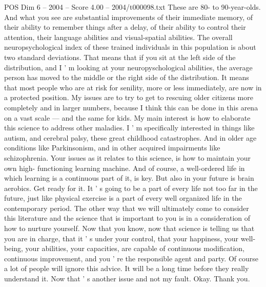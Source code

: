 \begin{textsample}{POS Dim 6 – 2004 – Score 4.00 – 2004/t000098.txt}
These are 80- to 90-year-olds.
And what you see are substantial improvements of their immediate memory, of their ability to remember things after a delay, of their ability to control their attention, their language abilities and visual-spatial abilities.
The overall neuropsychological index of these trained individuals in this population is about two standard deviations.
That means that if you sit at the left side of the distribution, and I ' m looking at your neuropyschological abilities, the average person has moved to the middle or the right side of the distribution.
It means that most people who are at risk for senility, more or less immediately, are now in a protected position.
My issues are to try to get to rescuing older citizens more completely and in larger numbers, because I think this can be done in this arena on a vast scale — and the same for kids.
My main interest is how to elaborate this science to address other maladies.
I ' m specifically interested in things like autism, and cerebral palsy, these great childhood catastrophes.
And in older age conditions like Parkinsonism, and in other acquired impairments like schizophrenia.
Your issues as it relates to this science, is how to maintain your own high- functioning learning machine.
And of course, a well-ordered life in which learning is a continuous part of it, is key.
But also in your future is brain aerobics.
Get ready for it.
It ' s going to be a part of every life not too far in the future, just like physical exercise is a part of every well organized life in the contemporary period.
The other way that we will ultimately come to consider this literature and the science that is important to you is in a consideration of how to nurture yourself.
Now that you know, now that science is telling us that you are in charge, that it ' s under your control, that your happiness, your well-being, your abilities, your capacities, are capable of continuous modification, continuous improvement, and you ' re the responsible agent and party.
Of course a lot of people will ignore this advice.
It will be a long time before they really understand it.
Now that ' s another issue and not my fault.
Okay.
Thank you.

\end{textsample}
